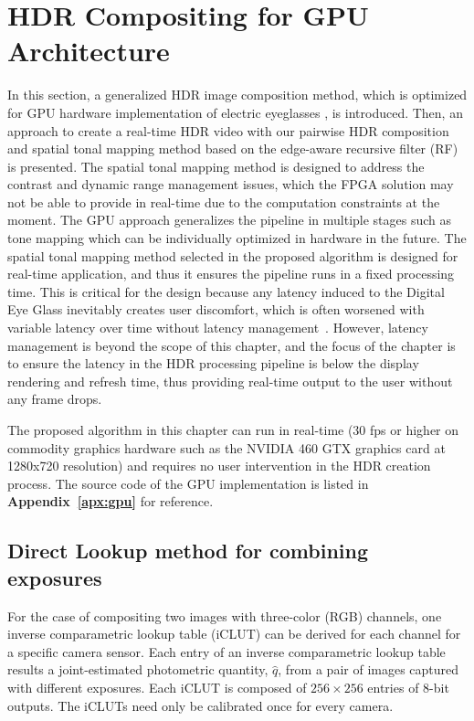 \section{HDR Compositing for GPU Architecture}

In this section, a generalized HDR image composition method, which is optimized for GPU hardware 
implementation of electric eyeglasses \cite{mannist,robertson2003estimation,ali2012ICASSP}, is 
introduced. Then, an approach to create a real-time HDR video with our pairwise HDR composition 
and spatial tonal mapping method based on the edge-aware recursive filter 
(RF)~\cite{GastalOliveira2011DomainTransform} is presented. The spatial tonal mapping method is 
designed to address the contrast and dynamic range management issues, which the FPGA solution 
may not be able to provide in real-time due to the computation constraints at the moment. The GPU 
approach generalizes the pipeline in multiple stages such as tone mapping which can be individually 
optimized in hardware in the future. The spatial tonal mapping method selected in the proposed 
algorithm is designed for real-time application, and thus it ensures the pipeline runs in a fixed 
processing time. This is critical for the design because any latency induced to the Digital Eye Glass 
inevitably creates user discomfort, which is often worsened with variable latency over time without 
latency management~\cite{jacobs1997managing}. However, latency management is beyond the 
scope of this chapter, and the focus of the chapter is to ensure the latency in the HDR processing 
pipeline is below the display rendering and refresh time, thus providing real-time output to the user 
without any frame drops.

The proposed algorithm in this chapter can run in real-time (30 fps or higher on commodity graphics 
hardware such as the NVIDIA 460 GTX graphics card at 1280x720 resolution) and requires no user 
intervention in the HDR creation process.  The source code of the GPU implementation is listed in 
\textbf{Appendix~\ref{apx:gpu}} for reference. 

\subsection{Direct Lookup method for combining exposures} \label{comp_2_lut}
For the case of compositing two images with three-color (RGB) channels, one inverse comparametric 
lookup table (iCLUT) can be derived for each channel for a specific camera sensor. Each entry of an 
inverse comparametric lookup table results a joint-estimated photometric quantity, $\hat{q}$, from a 
pair of images captured with different exposures. Each iCLUT is composed of $256\times256$ 
entries of 8-bit outputs. The iCLUTs need only be calibrated once for every camera.


